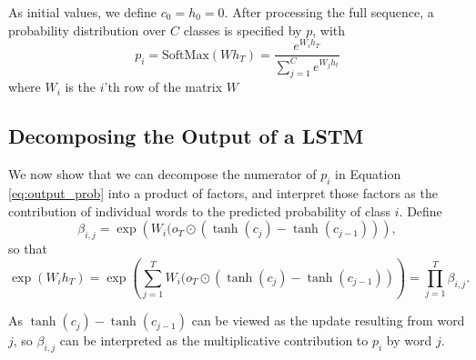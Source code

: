\documentclass{article}
\begin{document}
As initial values, we define $c_0=h_0=0$. After processing the full sequence, a probability distribution over $C$ classes is specified by $p$, with 
\begin{equation}
p_i = \text{SoftMax}(W h_T) = \frac{e^{W_i h_T}}{\sum_{j = 1} ^ C e^{W_j h_t}} \label{eq:output_prob}
\end{equation}
where $W_i$ is the $i$'th row of the matrix $W$

\subsection{Decomposing the Output of a LSTM}
\label{sec:decomposing}
We now show that we can decompose the numerator of $p_i$ in Equation  \ref{eq:output_prob} into a product of factors, and interpret those factors as the contribution of individual words to the predicted probability of class $i$. Define 
\begin{equation}\label{eq:beta} 
\beta_{i,j} = \exp\left(W_i (o_T \odot (\tanh(c_j)- \tanh(c_{j-1}))\right),
\end{equation}
 so that 
\[\exp( W_ih_T) = \exp\left(\sum_{j=1}^T W_i (o_T \odot (\tanh(c_j) - \tanh(c_{j-1}))\right) = \prod_{j=1}^T \beta_{i,j}.\]

 As $\tanh(c_j) - \tanh(c_{j-1})$ can be viewed as the update resulting from word $j$, so $\beta_{i,j}$ can be interpreted as the multiplicative contribution to $p_{i}$ by word $j$. 
\end{document}
